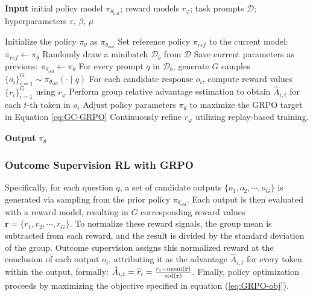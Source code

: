 \begin{itemize}[topsep=0pt]
\begin{itemize}[topsep=0pt]
\begin{algorithm}[t]
  \small
  \caption{Iterative Group Relative Policy Optimization}
  \textbf{Input} initial policy model $\pi_{\theta_{\text{init}}}$; reward models $r_\varphi$; task prompts $\mathcal{D}$; 
  hyperparameters $\varepsilon$, $\beta$, $\mu$
  \begin{algorithmic}[1]
    \State Initialize the policy $\pi_\theta$ as $\pi_{\theta_{\text{init}}}$
       \State Set reference policy $\pi_{ref}$ to the current model: $\pi_{ref} \leftarrow \pi_{\theta}$
      \State Randomly draw a minibatch $\mathcal{D}_b$ from $\mathcal{D}$
      \State Save current parameters as previous: $\pi_{\theta_{old}} \leftarrow \pi_{\theta}$ 
      \State For every prompt $q$ in $\mathcal{D}_b$, generate $G$ samples $\{o_i\}_{i=1}^G \sim \pi_{\theta_{old}} (\cdot \mid q)$
      \State For each candidate response $o_i$, compute reward values $\{r_i\}_{i=1}^{G}$ using $r_\varphi$
      \State Perform group relative advantage estimation to obtain $\hat{A}_{i,t}$ for each $t$-th token in $o_i$
        \State Adjust policy parameters $\pi_{\theta}$ to maximize the GRPO target in Equation \ref{eq:GC-GRPO}
      \EndFor
    \EndFor
    \State Continuously refine $r_\varphi$ utilizing replay-based training. 
    \EndFor 
  \end{algorithmic}
  \textbf{Output} $\pi_\theta$
  \label{alg:iter-grpo}
\end{algorithm}

\subsubsection{Outcome Supervision RL with GRPO} Specifically, for each question $q$, a set of candidate outputs $\{o_1, o_2, \cdots, o_G\}$ is generated via sampling from the prior policy $\pi_{\theta_{old}}$. Each output is then evaluated with a reward model, resulting in $G$ corresponding reward values $\mathbf{r} = \{r_1, r_2, \cdots, r_G\}$. To normalize these reward signals, the group mean is subtracted from each reward, and the result is divided by the standard deviation of the group. Outcome supervision assigns this normalized reward at the conclusion of each output $o_i$, attributing it as the advantage $\hat{A}_{i,t}$ for every token within the output, formally: $\hat{A}_{i, t} = \widetilde{r}_i = \frac{r_i- {\rm mean}(\mathbf{r})}{{\rm std}(\mathbf{r})}$. Finally, policy optimization proceeds by maximizing the objective specified in equation (\ref{eq:GRPO-obj}).


\end{itemize}
\end{itemize}
